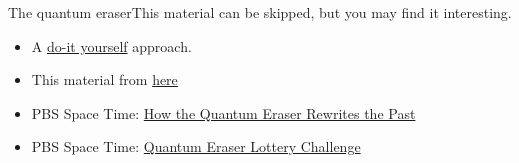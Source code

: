 \begin{frame}{The quantum eraser}{This material can be skipped, but you may find it interesting.}
\begin{itemize}
    \item A \href{https://www.scientificamerican.com/article/slide-show-do-it-yourself-diy-quantum-eraser/}{do-it yourself} approach.
    \item This material from \href{https://www.physlab.org/wp-content/uploads/2016/07/machzehnder-v4.pdf}{here}
    \item PBS Space Time: \href{https://www.youtube.com/watch?v=8ORLN_KwAgs}{How the Quantum Eraser Rewrites the Past}
    \item PBS Space Time: \href{https://www.youtube.com/watch?v=2Uzytrooz44}{Quantum Eraser Lottery Challenge}
\end{itemize}
\end{frame}

